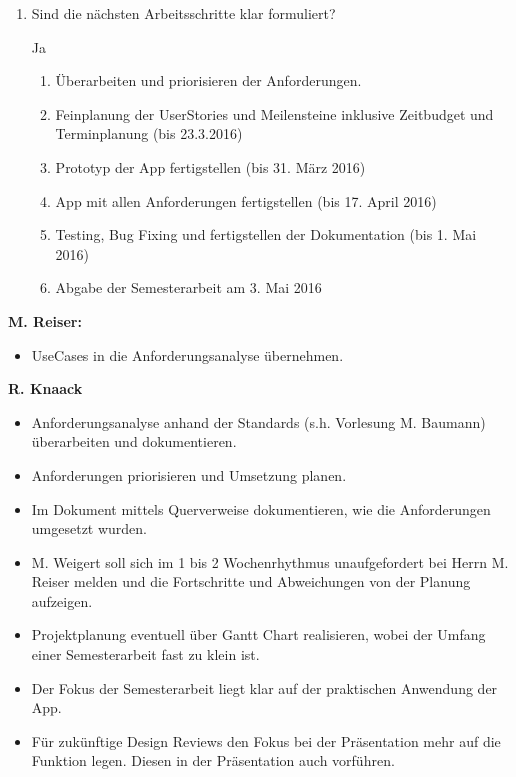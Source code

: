 \begin{enumerate}
	\item Sind die nächsten Arbeitsschritte klar formuliert?\\
	{\color{DarkSlateBlue}Ja
		\begin{enumerate}
			\item Überarbeiten und priorisieren der Anforderungen.
			\item Feinplanung der UserStories und Meilensteine inklusive Zeitbudget und Terminplanung (bis 23.3.2016)
			\item Prototyp der App fertigstellen (bis 31. März 2016)
			\item App mit allen Anforderungen fertigstellen (bis 17. April 2016)
			\item Testing, Bug Fixing und fertigstellen der Dokumentation (bis 1. Mai 2016)
			\item Abgabe der Semesterarbeit am 3. Mai 2016
		\end{enumerate}}
\end{enumerate}

\newpage

\textbf{M. Reiser:}
\begin{itemize}
	\item UseCases in die Anforderungsanalyse übernehmen.
\end{itemize}

\textbf{R. Knaack}
\begin{itemize}
	\item Anforderungsanalyse anhand der Standards (s.h. Vorlesung M. Baumann) überarbeiten und dokumentieren.
	\item Anforderungen priorisieren und Umsetzung planen.
	\item Im Dokument mittels Querverweise dokumentieren, wie die Anforderungen umgesetzt wurden.
	\item M. Weigert soll sich im 1 bis 2 Wochenrhythmus unaufgefordert bei Herrn M. Reiser melden und die Fortschritte und Abweichungen von der Planung aufzeigen.
	\item Projektplanung eventuell über Gantt Chart realisieren, wobei der Umfang einer Semesterarbeit fast zu klein ist.
	\item Der Fokus der Semesterarbeit liegt klar auf der praktischen Anwendung der App.
	\item Für zukünftige Design Reviews den Fokus bei der Präsentation mehr auf die Funktion legen. Diesen in der Präsentation auch vorführen.  
\end{itemize}